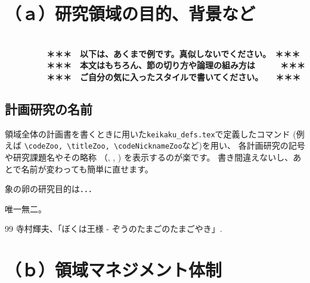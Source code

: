 \documentclass[11pt,a4j,dvipdfmx]{jarticle} 					%
\newcommand{\研究課題名}{象の卵}
\newcommand{\研究機関名}{逢坂大学}
\newcommand{\研究代表者氏名}{湯川秀樹}
\newcommand{\研究期間の最終元号年度}{6}  %
\begin{document}

\section{（ａ）研究領域の目的、背景など}

\JSPSInstructions	%

\textbf{\\　　　　　＊＊＊　以下は、あくまで例です。真似しないでください。　＊＊＊\\
　　　　　＊＊＊　本文はもちろん、節の切り方や論理の組み方は　　　＊＊＊\\
　　　　　＊＊＊　ご自分の気に入ったスタイルで書いてください。　　＊＊＊}

\subsection{計画研究の名前}
        領域全体の計画書を書くときに用いた\texttt{keikaku\_defs.tex}で定義したコマンド
        (例えば
        \texttt{\textbackslash codeZoo, \textbackslash titleZoo, \textbackslash codeNicknameZoo}など)を用い、
        各計画研究の記号や研究課題名やその略称
        （\codeZoo, \titleZoo, \codeNicknameZoo)
        を表示するのが楽です。
       書き間違えないし、あとで名前が変わっても簡単に直せます。

	 象の卵の研究目的は．．．

	唯一無二。




	\vspace{1cm}
	\begin{thebibliography}{99}
		 寺村輝夫、「ぼくは王様 - ぞうのたまごのたまごやき」.
	\end{thebibliography}




\section{（ｂ）領域マネジメント体制}
\end{document}
